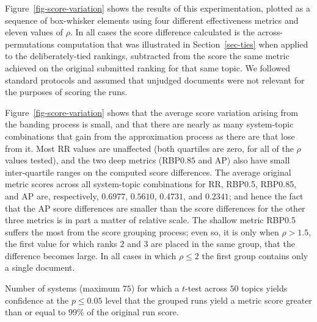Figure~\ref{fig-score-variation} shows the results of this
experimentation, plotted as a sequence of box-whisker elements using
four different effectiveness metrics and eleven values of $\rho$.
In all cases the score difference calculated is the
across-permutations computation that was illustrated in
Section~\ref{sec-ties} when applied to the deliberately-tied
rankings, subtracted from the score the same metric achieved on the
original submitted ranking for that same topic.
We followed standard protocols and assumed that unjudged documents
were not relevant for the purposes of scoring the runs.

Figure~\ref{fig-score-variation} shows that the average score
variation arising from the banding process is small, and that there
are nearly as many system-topic combinations that gain from the
approximation process as there are that lose from it.
Most RR values are unaffected (both quartiles are zero, for all of
the $\rho$ values tested), and the two deep metrics (RBP$0.85$ and
AP) also have small inter-quartile ranges on the computed score
differences.
The average original metric scores across all system-topic
combinations for RR, RBP0.5, RBP0.85, and AP are, respectively,
$0.6977$, $0.5610$, $0.4731$, and $0.2341$; and hence the fact that
the AP score differences are smaller than the score differences for
the other three metrics is in part a matter of relative scale.
The shallow metric RBP0.5 suffers the most from the score grouping
process; even so, it is only when $\rho>1.5$, the first value for
which ranks $2$ and $3$ are placed in the same group, that the
difference becomes large.
In all cases in which $\rho\le2$ the first group contains only a
single document.

\begin{table}[t!]
\centering

\caption{Number of systems (maximum $75$) for which a $t$-test across
$50$ topics yields confidence at the $p\le0.05$ level that the
grouped runs yield a metric score greater than or equal to $99$\% of
the original run score.
\label{tbl-frac-significant}}
\end{table}

